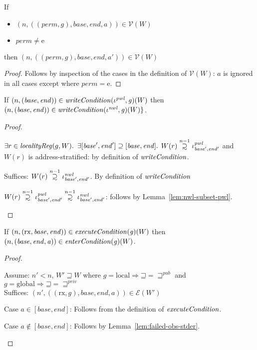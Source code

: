 \documentclass[a4paper]{article}
\newcommand\supsetsim{\mathrel{\ooalign{\raise.2ex\hbox{$\supset$}\cr
      \hidewidth\lower.8ex\hbox{\scalebox{0.9}{$\sim$}}\hidewidth\cr}}}
\newcommand{\nsupsim}[1][n]{\stackrel{\tiny{#1}}{\supsetsim}}
\newcommand{\var}[1]{\mathit{#1}}
\newcommand{\gl}{\var{g}}
\newcommand{\addr}{\var{a}}
\newcommand{\start}{\var{base}}
\newcommand{\addrend}{\var{end}}
\newcommand{\perm}{\var{perm}}
\newcommand{\nwl}{\var{nwl}}
\newcommand{\pwl}{\var{pwl}}
\newcommand{\plainfun}[2]{
  \ifthenelse{\equal{#2}{}}
  {\mathit{#1}}
  {\mathit{#1}(#2)}
}
\newcommand{\writeCond}[1]{\plainfun{writeCondition}{#1}}
\newcommand{\execCond}[1]{\plainfun{executeCondition}{#1}}
\newcommand{\entryCond}[1]{\plainfun{enterCondition}{#1}}
\newcommand{\future}{\mathbin{\sqsupseteq}}
\newcommand{\futurewk}{\mathbin{\sqsupseteq}^{\var{pub}}}
\newcommand{\futurestr}{\mathbin{\sqsupseteq}^{\var{priv}}}
\newcommand{\asmType}{\plaindom{AsmType}}
\newcommand{\plaindom}[1]{\mathrm{#1}}
\newcommand{\intr}[2]{\mathcal{#1}}
\newcommand{\valueintr}[1]{\intr{V}{#1}}
\newcommand{\exprintr}[1]{\intr{E}{#1}}
\newcommand{\stdvr}{\valueintr{\asmType}}
\newcommand{\stder}{\exprintr{\asmType}}
\newcommand{\npair}[2][n]{\left(#1,#2 \right)}
\newcommand{\plainperm}[1]{\mathrm{#1}}
\newcommand{\exec}{\plainperm{rx}}
\newcommand{\entry}{\plainperm{e}}
\newcommand{\local}{\plainperm{local}}
\newcommand{\glob}{\plainperm{global}}
\begin{document}
 \begin{lemma}
   \label{lem:conds-lea-suffice}
   If
   \begin{itemize}
   \item $\npair{((\perm,\gl),\start,\addrend,\addr)}\in\stdvr(W)$
   \item $\perm \neq \entry$
   \end{itemize}
 
   then $\npair{((\perm,\gl),\start,\addrend,\addr')} \in \stdvr(W)$
 \end{lemma}
 \begin{proof}
   Follows by inspection of the cases in the definition of $\stdvr(W)$: $a$ is
   ignored in all cases except where $\perm = \entry$.
 \end{proof}
 
 \begin{lemma}
   \label{lem:pwl-writecond-implies-nwl}
   If $\npair{(\start,\addrend)} \in \writeCond{}(\iota^\pwl,\gl)(W)$ then
   $\npair{(\start,\addrend)} \in \writeCond{}(\iota^\nwl,\gl)(W) \}$.
 \end{lemma}
 \begin{proof}
   \begin{enumproof}
   \item $\exists r \in \var{localityReg}(g,W) \ldotp$ $\exists
     [\start',\addrend'] \supseteq [\start,\addrend] \ldotp$ $W(r)\nsupsim[n-1]
     \iota^\pwl_{\start',\addrend'}$ and $W(r)$ is address-stratified: by definition of $\writeCond{}$.
   \item Suffices: $W(r)\nsupsim[n-1] \iota^\nwl_{\start',\addrend'}$. By
     definition of $\writeCond{}$
   \item $W(r)\nsupsim[n-1] \iota^\pwl_{\start',\addrend'} \nsupsim[n-1]
     \iota^\nwl_{\start',\addrend'}$: follows by Lemma~\ref{lem:nwl-subset-pwl}.
   \end{enumproof}
 \end{proof}
 
 \begin{lemma}
   \label{lem:execCond-implies-entryCond}
   If $\npair{(\exec,\start,\addrend)} \in \execCond{}(\gl)(W)$ then
     $\npair{(\start,\addrend,\addr)} \in \entryCond{}(\gl)(W)$.
 \end{lemma}
 \begin{proof}
   \begin{enumproof}
   \item Assume: $n' < n$, $W' \future W$ where $\gl = \local \Rightarrow
     \future = \futurewk$ and $\gl = \glob \Rightarrow \future = \futurestr$
     \\
     Suffices: $\npair[n']{((\exec,\gl),\start,\addrend,\addr)} \in \stder(W')$
   \item Case $\addr \in [\start,\addrend]$: Follows from the definition of
     $\execCond{}$.
   \item Case $\addr \not\in[\start,\addrend]$: Follows by
     Lemma~\ref{lem:failed-obs-stder}.
   \end{enumproof}
 \end{proof}
 
\end{document}
